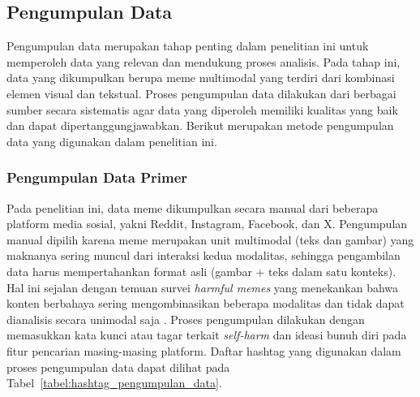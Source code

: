 \subsection{Pengumpulan Data} \label{subsec:pengumpulan_data}
Pengumpulan data merupakan tahap penting dalam penelitian ini untuk memperoleh data yang relevan dan mendukung proses analisis. Pada tahap ini, data yang dikumpulkan berupa meme multimodal yang terdiri dari kombinasi elemen visual dan tekstual. Proses pengumpulan data dilakukan dari berbagai sumber secara sistematis agar data yang diperoleh memiliki kualitas yang baik dan dapat dipertanggungjawabkan. Berikut merupakan metode pengumpulan data yang digunakan dalam penelitian ini.

\subsubsection{Pengumpulan Data Primer} \label{subsubsec:pengumpulan_data_primer}
Pada penelitian ini, data meme dikumpulkan secara manual dari beberapa platform media sosial, yakni Reddit, Instagram, Facebook, dan X. Pengumpulan manual dipilih karena meme merupakan unit multimodal (teks dan gambar) yang maknanya sering muncul dari interaksi kedua modalitas, sehingga pengambilan data harus mempertahankan format asli (gambar + teks dalam satu konteks). Hal ini sejalan dengan temuan survei \textit{harmful memes} yang menekankan bahwa konten berbahaya sering mengombinasikan beberapa modalitas dan tidak dapat dianalisis secara unimodal saja \cite{Sharma2022HarmfulMemes}. Proses pengumpulan dilakukan dengan memasukkan kata kunci atau tagar terkait \textit{self-harm} dan ideasi bunuh diri pada fitur pencarian masing-masing platform. Daftar hashtag yang digunakan dalam proses pengumpulan data dapat dilihat pada Tabel~\ref{tabel:hashtag_pengumpulan_data}.

